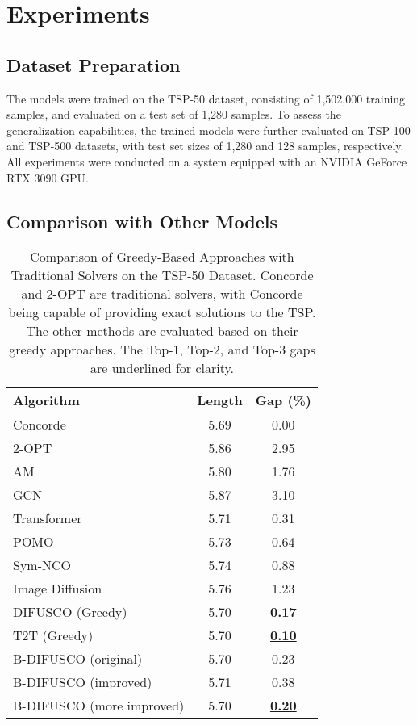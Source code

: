\section{Experiments}

\subsection{Dataset Preparation}
The models were trained on the TSP-50 dataset, consisting of 1,502,000 training samples, and evaluated on a test set of 1,280 samples. To assess the generalization capabilities, the trained models were further evaluated on TSP-100 and TSP-500 datasets, with test set sizes of 1,280 and 128 samples, respectively. All experiments were conducted on a system equipped with an NVIDIA GeForce RTX 3090 GPU.

\subsection{Comparison with Other Models}

\begin{table}[ht]
    \centering
    \caption{Comparison of Greedy-Based Approaches with Traditional Solvers on the TSP-50 Dataset. Concorde and 2-OPT are traditional solvers, with Concorde being capable of providing exact solutions to the TSP. The other methods are evaluated based on their greedy approaches. The Top-1, Top-2, and Top-3 gaps are underlined for clarity.}
    \label{tab:comparison}
    \begin{tabular}{|l|c|c|}
        \hline  
        \textbf{Algorithm} & \textbf{Length} & \textbf{Gap (\%)} \\ \hline
        Concorde              & 5.69   & 0.00   \\
        2-OPT                  & 5.86   & 2.95   \\
        \hline
        AM \cite{kool2019attention}                     & 5.80   & 1.76   \\
        GCN \cite{joshi2019tsp}                   & 5.87   & 3.10   \\
        Transformer \cite{bresson2021transformer}       & 5.71   & 0.31   \\
        POMO \cite{kwon2020pomo}                   & 5.73   & 0.64   \\
        Sym-NCO \cite{kim2022symnco}                & 5.74   & 0.88   \\
        Image Diffusion \cite{song2021ddim}       & 5.76   & 1.23   \\
        DIFUSCO (Greedy) \cite{sun2023difusco}          & 5.70   &  \underline{\textbf{0.17}}   \\
        T2T (Greedy) \cite{li2023t2t}        & 5.70   & \underline{\textbf{0.10}}   \\ \hline
        B-DIFUSCO (original) & 5.70 & 0.23  \\
        B-DIFUSCO (improved) & 5.71 & 0.38  \\
        B-DIFUSCO (more improved) & 5.70 & \underline{\textbf{0.20}}  \\
        \hline
    \end{tabular}
\end{table}

